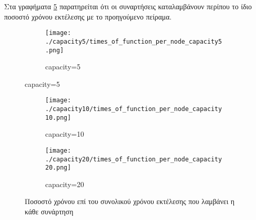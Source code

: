 \documentclass{article}
\newcommand{\eng}[1]{\foreignlanguage{english}{#1}} %
\begin{document}

Στα γραφήματα \ref{fig:scalability-funcs} παρατηρείται ότι οι συναρτήσεις
καταλαμβάνουν περίπου το ίδιο ποσοστό χρόνου εκτέλεσης με το προηγούμενο
πείραμα.

\begin{figure}[ht]
    \centering
    \begin{subfigure}{\textwidth}
        \texttt{[image: ./capacity5/times\_of\_function\_per\_node\_capacity5.png]}
        \caption{\eng{capacity=5}}
        \label{fig:scalability-funcs-5}
    \end{subfigure}
\end{figure}
\begin{figure}[ht]
    \ContinuedFloat
    \begin{subfigure}{\textwidth}
        \texttt{[image: ./capacity10/times\_of\_function\_per\_node\_capacity10.png]}
        \caption{\eng{capacity=10}}
        \label{fig:scalability-funcs-10}
    \end{subfigure}
    \centering
    \begin{subfigure}{\textwidth}
        \texttt{[image: ./capacity20/times\_of\_function\_per\_node\_capacity20.png]}
        \caption{\eng{capacity=20}}
        \label{fig:scalability-funcs-20}
    \end{subfigure}
    \caption{Ποσοστό χρόνου επί του συνολικού χρόνου εκτέλεσης που λαμβάνει η κάθε συνάρτηση}
    \label{fig:scalability-funcs}
\end{figure}
\FloatBarrier

\end{document}

